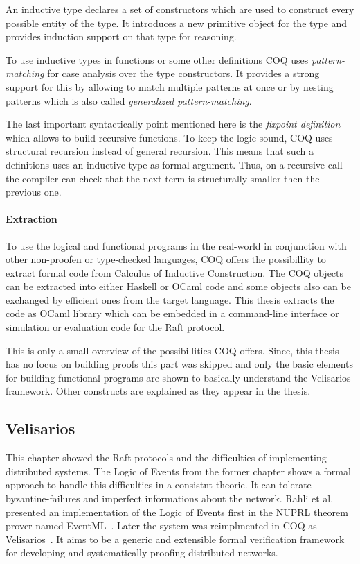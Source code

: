 \begin{defi}
  An inductive type declares a set of constructors which are used
  to construct every possible entity of the type. It introduces
  a new primitive object for the type and provides induction support
  on that type for reasoning.~\cite{paulin2011introduction}
\end{defi}

To use inductive types in functions or some other definitions COQ
uses \textit{pattern-matching} for case analysis over the type
constructors. It provides a strong support for this by allowing
to match multiple patterns at once or by nesting patterns which
is also called \textit{generalized
  pattern-matching}.~\cite{paulin2011introduction}

The last important syntactically point mentioned here is the \textit{fixpoint definition}
which allows to build recursive functions. To keep the logic sound, COQ uses
structural recursion instead of general recursion. This means that
such a definitions uses an inductive type as formal argument.
Thus, on a recursive call the compiler can check that the next
term is structurally smaller then the previous one.~\cite{paulin2011introduction}

\paragraph{Extraction}
To use the logical and functional programs in the real-world in conjunction
with other non-proofen or type-checked languages, COQ offers
the possibillity to extract formal code from Calculus of Inductive Construction.
The COQ objects can be extracted into either Haskell or OCaml code and
some objects also can be exchanged by efficient ones from the target
language. This thesis extracts the code as OCaml library which can be
embedded in a command-line interface or simulation or evaluation
code for the Raft protocol.~\cite{the_coq_development_team_2019_2554024}

This is only a small overview of the possibillities COQ offers. Since,
this thesis has no focus on building proofs this part was skipped and
only the basic elements for building functional programs are shown to
basically understand the Velisarios framework. Other constructs
are explained as they appear in the thesis.


\subsection{Velisarios}
This chapter showed the Raft protocols and the difficulties of
implementing distributed systems. The Logic of Events from the former
chapter shows a formal approach to handle this difficulties in
a consistnt theorie. It can tolerate byzantine-failures and
imperfect informations about the network. Rahli et al. presented
an implementation of the Logic of Events first in the NUPRL
theorem prover named EventML~\cite{rahli2017eventml}. Later
the system was reimplmented in COQ as Velisarios~\cite{rahli2018velisarios}.
It aims to be a generic and extensible formal verification framework
for developing and systematically proofing distributed networks.~\cite{rahli2018velisarios}

